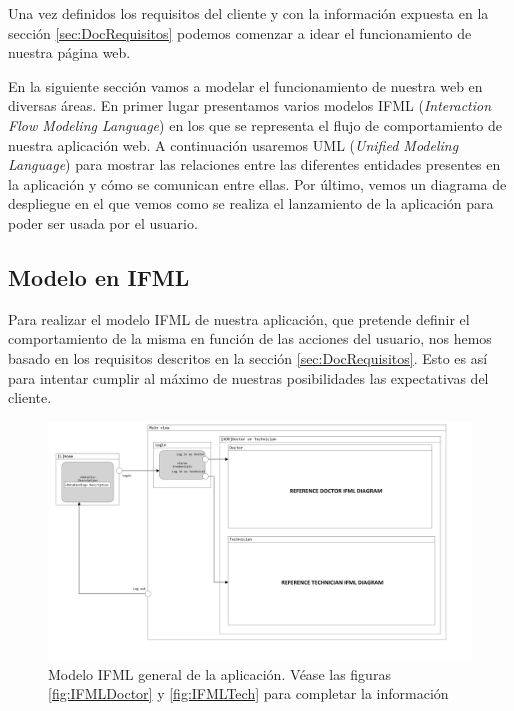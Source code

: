 Una vez definidos los requisitos del cliente y con la información expuesta en la sección \ref{sec:DocRequisitos} podemos comenzar a idear el funcionamiento de nuestra página web.

En la siguiente sección vamos a modelar el funcionamiento de nuestra web en diversas áreas. En primer lugar presentamos varios modelos IFML (\textit{Interaction Flow Modeling Language})\cite{IFML:Design} en los que se representa el flujo de comportamiento de nuestra aplicación web. A continuación usaremos UML (\textit{Unified Modeling Language})\cite{UMLWebsite} para mostrar las relaciones entre las diferentes entidades presentes en la aplicación y cómo se comunican entre ellas. Por último, vemos un diagrama de despliegue en el que vemos como se realiza el lanzamiento de la aplicación para poder ser usada por el usuario.

\subsection{Modelo en IFML}

Para realizar el modelo IFML de nuestra aplicación, que pretende definir el comportamiento de la misma en función de las acciones del usuario, nos hemos basado en los requisitos descritos en la sección \ref{sec:DocRequisitos}. Esto es así para intentar cumplir al máximo de nuestras posibilidades las expectativas del cliente.

\begin{figure}
	\centering
	\includegraphics[width=\textwidth]{images/General-IFML.png}
	\caption{Modelo IFML general de la aplicación. Véase las figuras \ref{fig:IFMLDoctor} y \ref{fig:IFMLTech} para completar la información}
	\label{fig:IFMLModel}
\end{figure}

